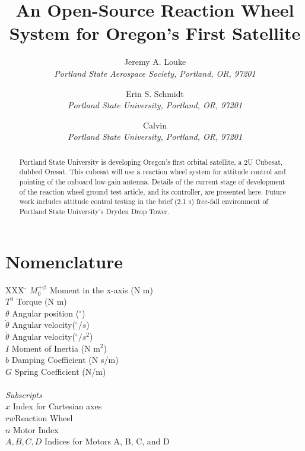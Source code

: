 \documentclass[]{aiaa-tc}%
\title{An Open-Source Reaction Wheel System for Oregon's First Satellite}
\author{
  Jeremy A. Louke\\
  {\normalsize\itshape
   Portland State Aerospace Society, Portland, OR, 97201}\\
  \and
  Erin S. Schmidt\\
  {\normalsize\itshape
  Portland State University, Portland, OR, 97201}
  \and
  Calvin\\
  {\normalsize\itshape
  Portland State University, Portland, OR, 97201}
 }
\begin{document}
\maketitle

\begin{abstract}
Portland State University is developing Oregon's first orbital satellite, a 2U Cubesat, dubbed Oresat. This cubesat will use a reaction wheel system for attitude control and pointing of the onboard low-gain antenna. Details of the current stage of development of the reaction wheel ground test article, and its controller, are presented here. Future work includes attitude control testing in the brief (2.1 s) free-fall environment of Portland State University's Dryden Drop Tower.
\end{abstract}

\section*{Nomenclature}

\begin{tabbing}
  XXX \= \kill%
  $M_0^{+ \circlearrowleft}$ \qquad Moment in the x-axis (N m)\\
  $T^0$ \qquad Torque (N m)\\
  $\theta$ \qquad Angular position (${}^{\circ}$)\\
  $\dot{\theta}$ \qquad Angular velocity(${}^{\circ}/s$)\\ 
  $\ddot{\theta}$ \qquad Angular velocity(${}^{\circ}/s^2$) \\
  $I$ \qquad Moment of Inertia (N $\textrm{m}^2$)\\
  $b$ \qquad Damping Coefficient (N s/m)\\ 
  $G$ \qquad Spring Coefficient (N/m)\\ \\
  \textit{Subscripts}\\
  $x$ \qquad Index for Cartesian axes \\
  $rw$\qquad Reaction Wheel\\
  $n$ \qquad Motor Index\\
  $A, B, C, D$ \qquad Indices for Motors A, B, C, and D\\
 \end{tabbing}
\end{document}

